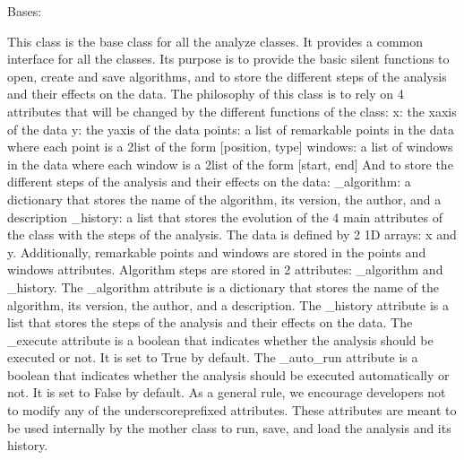 \documentclass[letterpaper,10pt,english]{sphinxmanual}
\begin{document}
\begin{fulllineitems}
\label{\detokenize{source/HDF5_BLS:HDF5_BLS.analyze.Analyze}}
\pysigstartsignatures
\pysiglinewithargsret
{}
{\sphinxparamcomma {}}
{}
\pysigstopsignatures
\sphinxAtStartPar
Bases: 

\sphinxAtStartPar
This class is the base class for all the analyze classes. It provides a common interface for all the classes. Its purpose is to provide the basic silent functions to open, create and save algorithms, and to store the different steps of the analysis and their effects on the data.
The philosophy of this class is to rely on 4 attributes that will be changed by the different functions of the class:
\sphinxhyphen{} x: the x\sphinxhyphen{}axis of the data
\sphinxhyphen{} y: the y\sphinxhyphen{}axis of the data
\sphinxhyphen{} points: a list of remarkable points in the data where each point is a 2\sphinxhyphen{}list of the form {[}position, type{]}
\sphinxhyphen{} windows: a list of windows in the data where each window is a 2\sphinxhyphen{}list of the form {[}start, end{]}
And to store the different steps of the analysis and their effects on the data:
\sphinxhyphen{} \_algorithm: a dictionary that stores the name of the algorithm, its version, the author, and a description
\sphinxhyphen{} \_history: a list that stores the evolution of the 4 main attributes of the class with the steps of the analysis.
The data is defined by 2 1\sphinxhyphen{}D arrays: x and y. Additionally, remarkable points and windows are stored in the points and windows attributes.
Algorithm steps are stored in 2 attributes: \_algorithm and \_history. The \_algorithm attribute is a dictionary that stores the name of the algorithm, its version, the author, and a description. The \_history attribute is a list that stores the steps of the analysis and their effects on the data.
The \_execute attribute is a boolean that indicates whether the analysis should be executed or not. It is set to True by default. The \_auto\_run attribute is a boolean that indicates whether the analysis should be executed automatically or not. It is set to False by default.
As a general rule, we encourage developers not to modify any of the underscore\sphinxhyphen{}prefixed attributes. These attributes are meant to be used internally by the mother class to run, save, and load the analysis and its history.

\end{fulllineitems}
\end{document}
